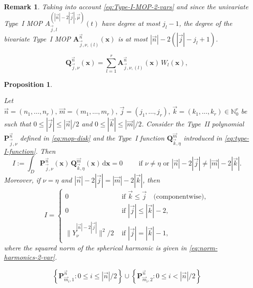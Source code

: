 \documentclass[10pt,a4paper]{amsart}
\newtheorem{proposition}{Proposition}
\newtheorem{remark}{Remark}
\newcommand{\NN}{\mathbb{N}}
\newcommand{\dr}{\mathrm{d}}
\begin{document}
    \begin{remark}\label{remark:degree-type-I}
    Taking into account \eqref{eq:Type-I-MOP-2-vars} and since the univariate Type~I MOP $A^{(|\vec n|-2|\vec j|, \vec \mu)}_{\vec j,l}(t)$ have degree at most $j_l-1$, the degree of the bivariate Type~I MOP $\mathbf A_{\vec j,\nu,(l)}^{\vec n}(\mathbf x)$ is at most $|\vec n|-2(|\vec j|-j_l+1)$.
    \end{remark}

    \begin{equation}
        \label{eq:type-I-function}
        \mathbf Q_{\vec j,\nu}^{\vec n}(\mathbf x)=\sum_{l=1}^r \mathbf A_{\vec j,\nu,(l)}^{\vec n}(\mathbf x)\, W_l(\mathbf x),
    \end{equation}

    \begin{proposition} \label{prop:biorthogonality}
    
    Let $\vec n = (n_1,\dots,n_r),\,\vec m=(m_1,\dots,m_r), \, \vec j = (j_1,\dots,j_r),\,\vec k =(k_1,\dots,k_r)\in\NN_0^r$ be such that $0\leq |\vec j| \leq |\vec n|/2$ and $0\leq|\vec k|\leq|\vec m|/2$. Consider the Type~II polynomial $\mathbf{P}_{\vec j,\nu}^{\vec n}$ defined in \eqref{eq:mop-disk} and the Type~I function $\mathbf Q_{\vec k,\eta}^{\vec m}$ introduced in \eqref{eq:type-I-function}. Then 
    \begin{equation}
        I:=\int_D \mathbf{P}_{\vec j,\nu}^{\vec n}(\mathbf x)\, \mathbf Q_{\vec k,\eta}^{\vec m}(\mathbf x)\, \dr \mathbf x = 0\qquad \text{ if } \nu\neq \eta \text{ or } |\vec n|-2|\vec j|\neq |\vec m|-2|\vec k|.
    \end{equation}
    Moreover, if $\nu=\eta$ and $|\vec n|-2|\vec j| = |\vec m|-2|\vec k|$, then
    \begin{equation}
        I= \begin{cases}
            0 & \text{ if }  \vec k\leq \vec j \quad \text{(componentwise)},\\
            0 & \text{ if }  |\vec j|\leq |\vec k|-2, \\
            \|Y_{\nu}^{|\vec n|-2|\vec j|}\|^2/2 & \text{ if }  |\vec j| = |\vec k| -1,
        \end{cases}
    \end{equation}
    where the squared norm of the spherical harmonic is given in \eqref{eq:norm-harmonics-2-var}.
    \end{proposition}

    \begin{equation}
        \label{eq:basis-MOP-n}
        \left\{\mathbf P_{\vec m_i,1}^{\vec n}: 0\leq i\leq |\vec n|/2\right\}\cup\left\{\mathbf P_{\vec m_i,2}^{\vec n}: 0\leq i< |\vec n|/2\right\}
    \end{equation}
\end{document}
